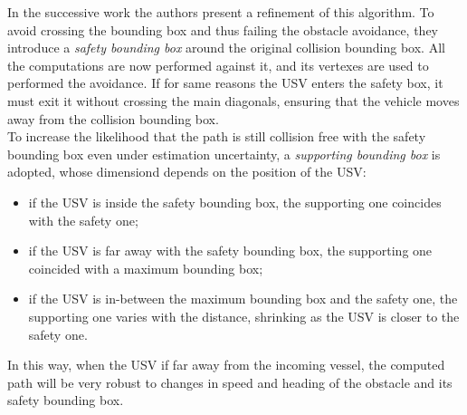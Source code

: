 \documentclass[12pt]{article}
\begin{document}
              \indent In the successive work \parencite{Simetti2014} the authors present a refinement of this algorithm. To avoid crossing the bounding box and thus failing the obstacle avoidance, they introduce a \textit{safety bounding box} around the original collision bounding box. All the computations are now performed against it, and its vertexes are used to performed the avoidance. If for same reasons the USV enters the safety box, it must exit it without crossing the main diagonals, ensuring that the vehicle moves away from the collision bounding box.\\
              To increase the likelihood that the path is still collision free with the safety bounding box even under estimation uncertainty, a \textit{supporting bounding box} is adopted, whose dimensiond depends on the position of the USV:
                    \begin{itemize}
                          \item if the USV is inside the safety bounding box, the supporting one coincides with the safety one;
                          \item if the USV is far away with the safety bounding box, the supporting one coincided with a maximum bounding box;
                          \item if the USV is in-between the maximum bounding box and the safety one, the supporting one varies with the distance, shrinking as the USV is closer to the safety one.
                    \end{itemize}
              In this way, when the USV if far away from the incoming vessel, the computed path will be very robust to changes in speed and heading of the obstacle and its safety bounding box.
\end{document}
